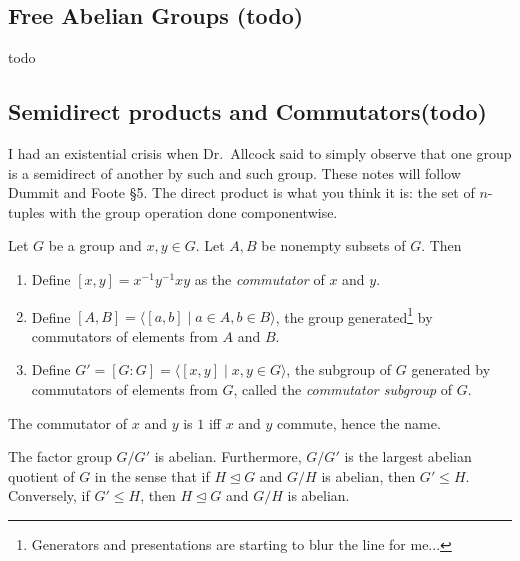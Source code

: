 \subsection{Free Abelian Groups (todo)}
todo
\subsection{Semidirect products and Commutators(todo)}
I had an existential crisis when Dr.\ Allcock said to simply observe that one group is a semidirect of another by such and such group. These notes will follow Dummit and Foote \S 5.
\orbreak
The direct product is what you think it is: the set of $n$-tuples with the group operation done componentwise.

\begin{definition}[Commutators]
    Let $G$ be a group and $x,y\in G$. Let $A,B$ be nonempty subsets of $G$. Then 
    \begin{enumerate}
        \item Define $[x,y]=x^{-1}y^{-1}xy$ as the \emph{commutator} of $x$ and $y$.
        \item Define $[A,B]=\langle [a,b] \mid a\in A,b\in B \rangle $, the group generated\footnote{Generators and presentations are starting to blur the line for me...} by commutators of elements from $A$ and $B$.
        \item Define $G'=[G:G]=\langle [x,y] \mid x,y\in G \rangle $, the subgroup of $G$ generated by commutators of elements from $G$, called the \emph{commutator subgroup} of $G$.
    \end{enumerate}
\end{definition}
The commutator of $x$ and $y$ is $1$ iff $x$ and $y$ commute, hence the name.
\begin{prop}
    The factor group $G /G'$ is abelian. Furthermore, $G /G'$ is the largest abelian quotient of $G$ in the sense that if $H \trianglelefteq G$ and $G /H$ is abelian, then $G'\leq H$. Conversely, if $G' \leq H$, then $H \trianglelefteq G$ and $G /H$ is abelian.
\end{prop}
